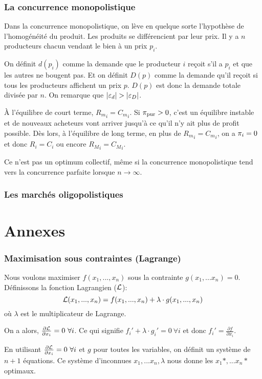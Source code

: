 \section{La concurrence monopolistique}
Dans la concurrence monopolistique, on lève en quelque sorte l'hypothèse de
l'homogénéité du produit.
Les produits se différencient par leur prix.
Il y a $n$ producteurs chacun vendant le bien à un prix $p_i$.

On définit $d(p_i)$ comme la demande que le producteur $i$ reçoit s'il a
$p_i$ et que les autres ne bougent pas.
Et on définit $D(p)$ comme la demande qu'il reçoit si tous
les producteurs affichent un prix $p$.
$D(p)$ est donc la demande totale divisée par $n$.
On remarque que $|\varepsilon_d| > |\varepsilon_D|$.

À l'équilibre de court terme, ${R_m}_i = {C_m}_i$.
Si $\pi_{\mathrm{pur}} > 0$, c'est un équilibre instable et de nouveaux
acheteurs vont arriver jusqu'à ce qu'il n'y ait plus de profit possible.
Dès lors, à l'équilibre de long terme,
en plus de ${R_m}_i = {C_m}_i$, on a $\pi_i = 0$ et donc $R_i = C_i$
ou encore ${R_M}_i = {C_M}_i$.

Ce n'est pas un optimum collectif, même si la concurrence monopolistique
tend vers la concurrence parfaite lorsque $n \to \infty$.

\section{Les marchés oligopolistiques}



\part{Annexes}
\appendix
\section{Maximisation sous contraintes (Lagrange)}
Nous voulons maximiser $f(x_1,..., x_n)$ sous la contrainte $g(x_1,...x_n) = 0$.
Définissons la fonction Lagrangien ($\mathcal{L}$):
$$\mathcal{L}(x_1,..., x_n) = f(x_1,..., x_n) + \lambda\cdot g(x_1,..., x_n)$$
où $\lambda$ est le multiplicateur de Lagrange.

On a alors, $\frac{\partial \mathcal{L}}{\partial x_i} = 0\ \forall i$. Ce qui signifie
$f_i' + \lambda\cdot g_i' = 0\ \forall i$ et donc
$f_i' = \frac{\partial f}{\partial x_i}$.

En utilisant $\frac{\partial \mathcal{L}}{\partial x_i} = 0\ \forall i$ et $g$ pour
toutes les variables, on définit un système de $n+1$ équations. Ce système
d'inconnues $x_1,...x_n, \lambda$ nous donne les $x_1*,...x_n*$ optimaux.

